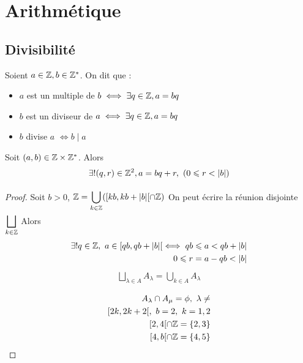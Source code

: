 \chapter{Arithmétique}
\section{Divisibilité}
\begin{definition}
Soient $a \in \mathbb{Z}, b \in \mathbb{Z}^*$. 
On dit que :
\begin{itemize}
\item $a$ est un multiple de $b \iff \exists q \in \mathbb{Z}, a = bq$
\item $b$ est un diviseur de $a \iff \exists q \in \mathbb{Z}, a = bq$
\item $b$ divise $a$ $\iff b \mid a$
\end{itemize}
\end{definition}

\begin{theoreme}
Soit $(a, b) \in \mathbb{Z} \times \mathbb{Z}^*$. Alors
\begin{align*}
\exists ! (q, r) \in \mathbb{Z}^2, a = bq + r,\ (0 \leqslant r < |b|)
\end{align*}
\end{theoreme}

\begin{proof}
Soit $b > 0$, $\mathbb{Z} = \displaystyle{\bigcup_{k \in \mathbb{Z}}^{}} ([kb, kb + |b|[ \cap \mathbb{Z})$ On peut écrire la réunion disjointe $\displaystyle{\bigsqcup_{k \in \mathbb{Z}}^{}}$
Alors 
\begin{align*}
\exists ! q \in \mathbb{Z},\ a \in [qb, qb + |b|[ \iff qb \leqslant a < qb + |b|
\\
0 \leqslant r = a - qb < |b|
\end{align*}
\begin{align*}
\bigsqcup_{\lambda \in A} A_{\lambda} = \bigcup_{k \in A} A_{\lambda}
\end{align*}

\begin{align*}
A_{\lambda} \cap A_{\mu} = \phi,\ \lambda \neq \\
[2k, 2k+2[,\ b = 2, \ k = 1, 2 \\
[2, 4[ \cap \mathbb{Z} = \{2,  3\}
\\
[4, b[ \cap \mathbb{Z} = \{4, 5\}
\end{align*}
\end{proof}

